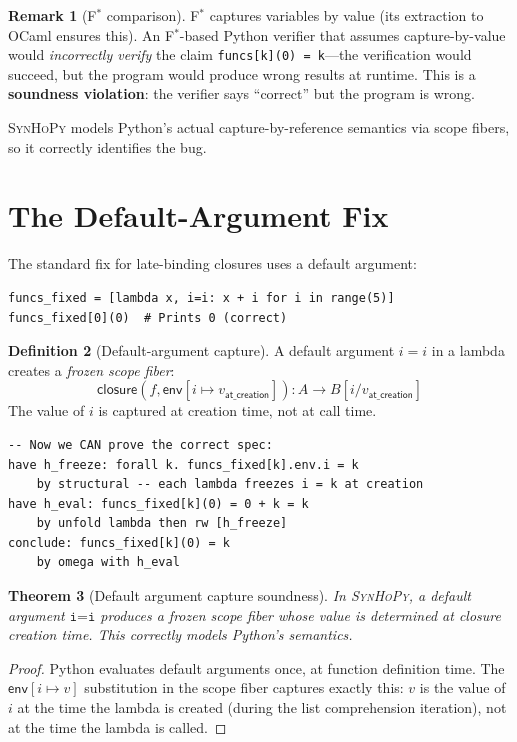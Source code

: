 \documentclass[11pt,a4paper]{report}
\theoremstyle{definition}
\newtheorem{definition}{Definition}[chapter]
\newtheorem{remark}[definition]{Remark}
\theoremstyle{plain}
\newtheorem{theorem}[definition]{Theorem}
\newcommand{\fstar}{F$^{*}$}
\newcommand{\synhopy}{\textsc{SynHoPy}}
\begin{document}
\begin{remark}[\fstar{} comparison]
\fstar{} captures variables by value (its extraction to OCaml ensures this). An
\fstar{}-based Python verifier that assumes capture-by-value would
\emph{incorrectly verify} the claim \texttt{funcs[k](0) = k}---the verification
would succeed, but the program would produce wrong results at runtime. This is a
\textbf{soundness violation}: the verifier says ``correct'' but the program is
wrong.

\synhopy{} models Python's actual capture-by-reference semantics via scope fibers,
so it correctly identifies the bug.
\end{remark}

\section{The Default-Argument Fix}

The standard fix for late-binding closures uses a default argument:
\begin{lstlisting}[style=python]
funcs_fixed = [lambda x, i=i: x + i for i in range(5)]
funcs_fixed[0](0)  # Prints 0 (correct)
\end{lstlisting}

\begin{definition}[Default-argument capture]
A default argument $i=i$ in a lambda creates a \emph{frozen scope fiber}:
\[
  \mathsf{closure}(f, \mathsf{env}[i \mapsto v_{\mathsf{at\_creation}}])
  : A \to B[i / v_{\mathsf{at\_creation}}]
\]
The value of $i$ is captured at creation time, not at call time.
\end{definition}

\begin{lstlisting}[style=proof]
-- Now we CAN prove the correct spec:
have h_freeze: forall k. funcs_fixed[k].env.i = k
    by structural -- each lambda freezes i = k at creation
have h_eval: funcs_fixed[k](0) = 0 + k = k
    by unfold lambda then rw [h_freeze]
conclude: funcs_fixed[k](0) = k
    by omega with h_eval
\end{lstlisting}

\begin{theorem}[Default argument capture soundness]
In \synhopy{}, a default argument $\texttt{i=i}$ produces a frozen scope fiber
whose value is determined at closure creation time.  This correctly models
Python's semantics.
\end{theorem}
\begin{proof}
Python evaluates default arguments once, at function definition time.
The $\mathsf{env}[i \mapsto v]$ substitution in the scope fiber captures
exactly this: $v$ is the value of $i$ at the time the lambda is created
(during the list comprehension iteration), not at the time the lambda is called.
\end{proof}
\end{document}
